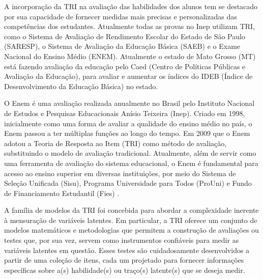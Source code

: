 A incorporação da TRI na avaliação das habilidades dos alunos tem se destacado por sua capacidade de fornecer medidas mais precisas e personalizadas das competências dos estudantes. Atualmente todas as provas no Inep utilizam TRI, como o Sistema de Avaliação de Rendimento Escolar do Estado de São Paulo (SARESP), o Sistema de Avaliação da Educação Básica (SAEB) e o Exame Nacional do Ensino Médio (ENEM). Atualmente o estado de Mato Grosso (MT) está fazendo avaliação da educação pelo Caed (Centro de Políticas Públicas e Avaliação da Educação), para avaliar e aumentar os índices do IDEB (Índice de Desenvolvimento da Educação Básica) no estado.

O Enem é uma avaliação realizada anualmente no Brasil pelo Instituto Nacional de Estudos e Pesquisas Educacionais Anísio Teixeira (Inep). Criado em 1998, inicialmente como uma forma de avaliar a qualidade do ensino médio no país, o Enem passou a ter múltiplas funções ao longo do tempo. Em 2009 que o Enem adotou a Teoria de Resposta ao Item (TRI) como método de avaliação, substituindo o modelo de avaliação tradicional. Atualmente, além de servir como uma ferramenta de avaliação do sistema educacional, o Enem é fundamental para acesso ao ensino superior em diversas instituições, por meio do Sistema de Seleção Unificada (Sisu), Programa Universidade para Todos (ProUni) e Fundo de Financiamento Estudantil (Fies) \cite{inephistorico}.


A família de modelos da TRI foi concebida para abordar a complexidade inerente à mensuração de variáveis latentes. Em particular, a TRI oferece um conjunto de modelos matemáticos e metodologias que permitem a construção de avaliações ou testes que, por sua vez, servem como instrumentos confiáveis para medir as variáveis latentes em questão. Esses testes são cuidadosamente desenvolvidos a partir de uma coleção de itens, cada um projetado para fornecer informações específicas sobre a(s) habilidade(s) ou traço(s) latente(s) que se deseja medir. \cite{pasquali2018}
  

\begin{comment}
	Atualmente, o Enem é dividido em 5 partes, a redação e 4 áreas de conhecimento: Linguagens, Ciências Humanas, Matemática e Ciências da Natureza. Cada uma dessas áreas é considerado como uma habilidade $\theta$. O ENEM estima cada uma dessas habilidades separadamente. Considerando que cada área está medindo o mesmo $\theta$ \cite{inep2021}.
	
	
	Além disso, ao utilizar modelos estatísticos sofisticados, a TRI é capaz de estimar as habilidades latentes dos alunos de forma mais precisa, levando em consideração a dificuldade dos itens e a capacidade discriminativa de cada questão. Dessa forma, a TRI oferece uma abordagem mais justa e confiável para avaliar o progresso dos alunos, fornecendo informações valiosas que podem ser usadas para direcionar o ensino, identificar alunos que precisam de apoio adicional e melhorar o currículo escolar. Consequentemente, a TRI desempenha um papel essencial na promoção de práticas educacionais eficazes e na melhoria contínua da qualidade da educação.
	
\end{comment}


